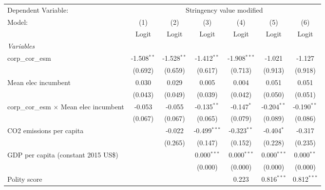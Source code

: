 
\begingroup
\centering
\begin{tabular}{lcccccc}
   \toprule
   Dependent Variable: & \multicolumn{6}{c}{Stringency value modified}\\
   Model:                                         & (1)           & (2)           & (3)            & (4)            & (5)           & (6)\\  
                                                  &  Logit        & Logit         & Logit          & Logit          & Logit         & Logit\\  
   \midrule
   \emph{Variables}\\
   corp\_cor\_esm                                 & -1.508$^{**}$ & -1.528$^{**}$ & -1.412$^{**}$  & -1.908$^{***}$ & -1.021        & -1.127\\   
                                                  & (0.692)       & (0.659)       & (0.617)        & (0.713)        & (0.913)       & (0.918)\\   
   Mean elec incumbent                            & 0.030         & 0.029         & 0.005          & 0.004          & 0.051         & 0.051\\   
                                                  & (0.043)       & (0.049)       & (0.039)        & (0.042)        & (0.050)       & (0.051)\\   
   corp\_cor\_esm $\times$ Mean elec incumbent    & -0.053        & -0.055        & -0.135$^{**}$  & -0.147$^{*}$   & -0.204$^{**}$ & -0.190$^{**}$\\   
                                                  & (0.067)       & (0.067)       & (0.065)        & (0.079)        & (0.089)       & (0.086)\\   
   CO2 emissions per capita                       &               & -0.022        & -0.499$^{***}$ & -0.323$^{**}$  & -0.404$^{*}$  & -0.317\\   
                                                  &               & (0.265)       & (0.147)        & (0.152)        & (0.228)       & (0.235)\\   
   GDP per capita (constant 2015 US\$)            &               &               & 0.000$^{***}$  & 0.000$^{***}$  & 0.000$^{***}$ & 0.000$^{**}$\\   
                                                  &               &               & (0.000)        & (0.000)        & (0.000)       & (0.000)\\   
   Polity score                                   &               &               &                & 0.223          & 0.816$^{***}$ & 0.812$^{***}$\\   

\end{tabular}
